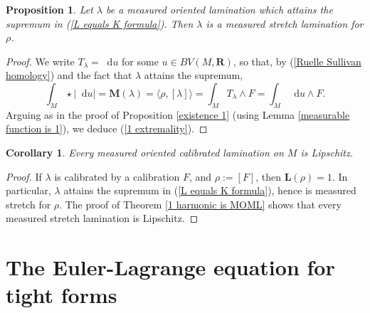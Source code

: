 \documentclass[reqno,11pt]{amsart}
\newcommand{\RR}{\mathbf{R}}
\newcommand*\dif{\mathop{}\!\mathrm{d}}
\newcommand{\Mass}{\mathbf M}
\newcommand{\Comass}{\mathbf L}
\newtheorem{proposition}[theorem]{Proposition}
\newtheorem{corollary}[theorem]{Corollary}
\theoremstyle{definition}
\numberwithin{equation}{section}
\begin{document}
\begin{proposition}\label{calibrated means measured stretch}
Let $\lambda$ be a measured oriented lamination which attains the supremum in (\ref{L equals K formula}).
Then $\lambda$ is a measured stretch lamination for $\rho$.
\end{proposition}
\begin{proof}
We write $T_\lambda = \dif u$ for some $u \in BV(M, \RR)$, so that, by (\ref{Ruelle Sullivan homology}) and the fact that $\lambda$ attains the supremum,
$$\int_M \star |\dif u| = \Mass(\lambda) = \langle \rho, [\lambda]\rangle = \int_M T_\lambda \wedge F = \int_M \dif u \wedge F.$$
Arguing as in the proof of Proposition \ref{existence 1} (using Lemma \ref{measurable function is 1}), we deduce (\ref{1 extremality}).
\end{proof}

\begin{corollary}
Every measured oriented calibrated lamination on $M$ is Lipschitz.
\end{corollary}
\begin{proof}
If $\lambda$ is calibrated by a calibration $F$, and $\rho := [F]$, then $\Comass(\rho) = 1$.
In particular, $\lambda$ attains the supremum in (\ref{L equals K formula}), hence is measured stretch for $\rho$.
The proof of Theorem \ref{1 harmonic is MOML} shows that every measured stretch lamination is Lipschitz.
\end{proof}

\section{The Euler-Lagrange equation for tight forms}\label{infinityMax}
\end{document}
